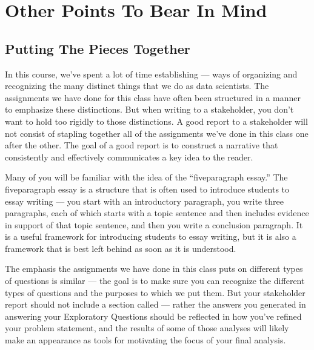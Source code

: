 \documentclass[letterpaper,10pt,english]{jupyterBook}
\begin{document}
\section{Other Points To Bear In Mind}
\label{\detokenize{40_in_practice/25_writing_to_stakeholders:other-points-to-bear-in-mind}}

\subsection{Putting The Pieces Together}
\label{\detokenize{40_in_practice/25_writing_to_stakeholders:putting-the-pieces-together}}
\sphinxAtStartPar
In this course, we’ve spent a lot of time establishing  — ways of organizing and recognizing the many distinct things that we do as data scientists. The assignments we have done for this class have often been structured in a manner to emphasize these distinctions. But when writing to a stakeholder, you don’t want to hold too rigidly to those distinctions. A good report to a stakeholder will not consist of stapling together all of the assignments we’ve done in this class one after the other. The goal of a good report is to construct a narrative that consistently and effectively communicates a key idea to the reader.

\sphinxAtStartPar
Many of you will be familiar with the idea of the “five\sphinxhyphen{}paragraph essay.” The five\sphinxhyphen{}paragraph essay is a structure that is often used to introduce students to essay writing — you start with an introductory paragraph, you write three paragraphs, each of which starts with a topic sentence and then includes evidence in support of that topic sentence, and then you write a conclusion paragraph. It is a useful framework for introducing students to essay writing, but it is also a framework that is best left behind as soon as it is understood.

\sphinxAtStartPar
The emphasis the assignments we have done in this class puts on different types of questions is similar — the goal is to make sure you can recognize the different types of questions and the purposes to which we put them. But your stakeholder report should not include a section called  — rather the answers you generated in answering your Exploratory Questions should be reflected in how you’ve refined your problem statement, and the results of some of those analyses will likely make an appearance as tools for motivating the focus of your final analysis.
\end{document}
